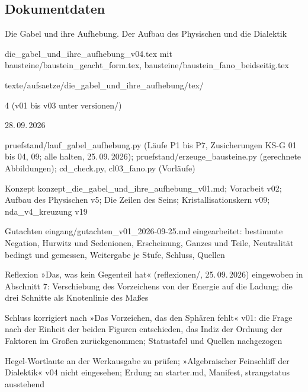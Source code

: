 \documentclass[11pt,a4paper]{article}
\begin{document}
\subsection*{Dokumentdaten}
\begin{description}[itemsep=0pt,font=\normalfont\bfseries]
\item[Titel:] Die Gabel und ihre Aufhebung. Der Aufbau des Physischen und die Dialektik
\item[Datei:] die\_gabel\_und\_ihre\_aufhebung\_v04.tex mit bausteine/baustein\_geacht\_form.tex, bausteine/baustein\_fano\_beidseitig.tex
\item[Ablage:] texte/aufsaetze/die\_gabel\_und\_ihre\_aufhebung/tex/
\item[Version:] 4 (v01 bis v03 unter versionen/)
\item[Datum:] 28.\,09.\,2026
\item[Prüfstand:] pruefstand/lauf\_gabel\_aufhebung.py (Läufe P1 bis P7, Zusicherungen KS-G 01 bis 04, 09; alle halten, 25.\,09.\,2026); pruefstand/erzeuge\_bausteine.py (gerechnete Abbildungen); cd\_check.py, cl03\_fano.py (Vorläufe)
\item[Grundlage:] Konzept konzept\_die\_gabel\_und\_ihre\_aufhebung\_v01.md; Vorarbeit v02; Aufbau des Physischen v5; Die Zeilen des Seins; Kristallisationskern v09; nda\_v4\_kreuzung v19
\item[Änderung v2:] Gutachten eingang/gutachten\_v01\_2026-09-25.md eingearbeitet: bestimmte Negation, Hurwitz und Sedenionen, Erscheinung, Ganzes und Teile, Neutralität bedingt und gemessen, Weitergabe je Stufe, Schluss, Quellen
\item[Änderung v3:] Reflexion »Das, was kein Gegenteil hat« (reflexionen/, 25.\,09.\,2026) eingewoben in Abschnitt 7: Verschiebung des Vorzeichens von der Energie auf die Ladung; die drei Schnitte als Knotenlinie des Maßes
\item[Änderung v4:] Schluss korrigiert nach »Das Vorzeichen, das den Sphären fehlt« v01: die Frage nach der Einheit der beiden Figuren entschieden, das Indiz der Ordnung der Faktoren im Großen zurückgenommen; Statustafel und Quellen nachgezogen
\item[Offen:] Hegel-Wortlaute an der Werkausgabe zu prüfen; »Algebraischer Feinschliff der Dialektik« v04 nicht eingesehen; Erdung an starter.md, Manifest, strangstatus ausstehend
\end{description}
\end{document}
